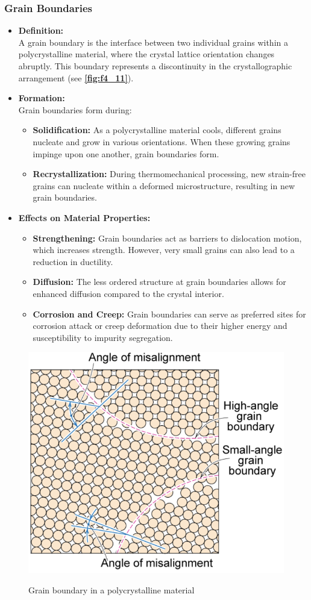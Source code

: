\subsubsection{Grain Boundaries}
\begin{itemize}
  \item \textbf{Definition:} \\
    A grain boundary is the interface between two individual grains within a polycrystalline material, where the crystal lattice orientation changes abruptly. This boundary represents a discontinuity in the crystallographic arrangement (see \textbf{\autoref{fig:f4_11}}).
  \item \textbf{Formation:} \\
    Grain boundaries form during:
    \begin{itemize}
      \item \textbf{Solidification:} As a polycrystalline material cools, different grains nucleate and grow in various orientations. When these growing grains impinge upon one another, grain boundaries form.
      \item \textbf{Recrystallization:} During thermomechanical processing, new strain-free grains can nucleate within a deformed microstructure, resulting in new grain boundaries.
    \end{itemize}
  \item \textbf{Effects on Material Properties:}
    \begin{itemize}
      \item \textbf{Strengthening:} Grain boundaries act as barriers to dislocation motion, which increases strength. However, very small grains can also lead to a reduction in ductility.
      \item \textbf{Diffusion:} The less ordered structure at grain boundaries allows for enhanced diffusion compared to the crystal interior.
      \item \textbf{Corrosion and Creep:} Grain boundaries can serve as preferred sites for corrosion attack or creep deformation due to their higher energy and susceptibility to impurity segregation.
    \end{itemize}
\end{itemize}

\begin{figure}[ht]
  \centering
  \caption{Grain boundary in a polycrystalline material}
  \includegraphics[width=0.35\linewidth]{./figures/f4_11.png}
  \label{fig:f4_11}
\end{figure}


